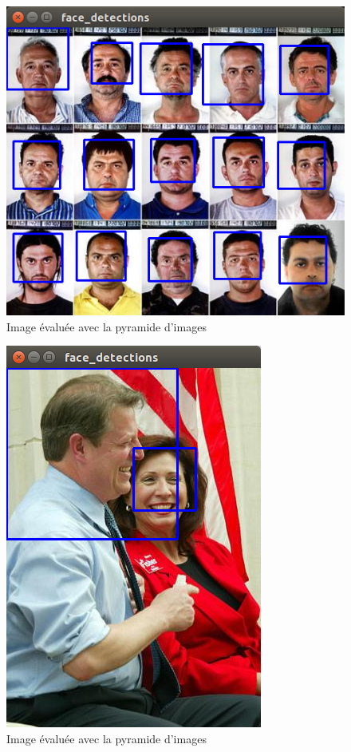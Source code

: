 \documentclass[a4paper,11pt]{article}
\begin{document}
	\begin{figure}[H]
	    \centering
	    \includegraphics[scale=0.3]{first_scale.png}
	    \caption{Image évaluée avec la pyramide d'images}
	    \label{fig:first_scale}
	\end{figure}
	\begin{figure}[H]
	    \centering
	    \includegraphics[scale=0.3]{scale_2.png}
	    \caption{Image évaluée avec la pyramide d'images}
	    \label{fig:scale_2}
	\end{figure}
\end{document}
